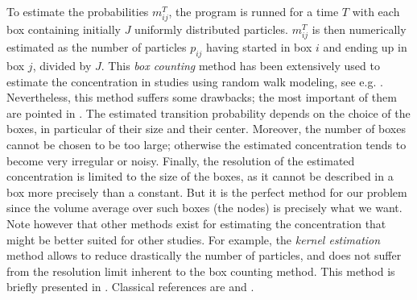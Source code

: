 To estimate the probabilities $m^T_{ij}$, the program is runned for a time $T$ with each box containing initially $J$ uniformly distributed particles. $m^T_{ij}$ is then numerically estimated as the number of particles $p_{ij}$ having started in box $i$ and ending up in box $j$, divided by $J$. This \textit{box counting} method has been extensively used to estimate the concentration in studies using random walk modeling, see e.g. \cite{riddle1998specification}. Nevertheless, this method suffers some drawbacks; the most important of them are pointed in \cite{spivakovskaya2007lagrangian}. The estimated transition probability depends on the choice of the boxes, in particular of their size and their center. Moreover, the number of boxes cannot be chosen to be too large; otherwise the estimated concentration tends to become very irregular or noisy. Finally, the resolution of the estimated concentration is limited to the size of the boxes, as it cannot be described in a box more precisely than a constant. But it is the perfect method for our problem since the volume average over such boxes (the nodes) is precisely what we want. Note however that other methods exist for estimating the concentration that might be better suited for other studies. For example, the \textit{kernel estimation} method allows to reduce drastically the number of particles, and does not suffer from the resolution limit inherent to the box counting method. This method is briefly presented in \cite{spivakovskaya2007lagrangian}. Classical references are \cite{silverman1986density} and \cite{wand1995kernel}.


